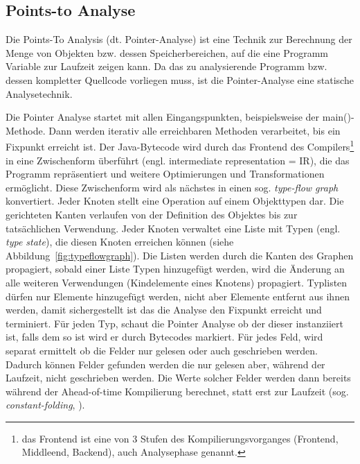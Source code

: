 \subsection{Points-to Analyse}
\label{subsec:pointsto}

Die Points-To Analysis (dt. Pointer-Analyse) ist eine Technik zur Berechnung der Menge von Objekten bzw. dessen Speicherbereichen, auf die eine Programm Variable zur Laufzeit zeigen kann\cite{Hind2001, Smaragdakis2015}. Da das zu analysierende Programm bzw. dessen kompletter Quellcode vorliegen muss, ist die Pointer-Analyse eine statische Analysetechnik.

Die Pointer Analyse startet mit allen Eingangspunkten, beispielsweise der main()-Methode. Dann werden iterativ alle erreichbaren Methoden verarbeitet, bis ein Fixpunkt erreicht ist. Der Java-Bytecode wird durch das Frontend des Compilers\footnote{das Frontend ist eine von 3 Stufen des Kompilierungsvorganges (Frontend, Middleend, Backend), auch Analysephase genannt.} in eine Zwischenform überführt (engl. intermediate representation = IR), die das Programm repräsentiert und weitere Optimierungen und Transformationen ermöglicht\cite{Simon2015}. 
Diese Zwischenform wird als nächstes in einen sog. \textit{type-flow graph} konvertiert. Jeder Knoten stellt eine Operation auf einem Objekttypen dar. Die gerichteten Kanten verlaufen von der Definition des Objektes bis zur tatsächlichen Verwendung. Jeder Knoten verwaltet eine Liste mit Typen (engl. \textit{type state}), die diesen Knoten erreichen können (siehe Abbildung~\ref{fig:typeflowgraph}). 
Die Listen werden durch die Kanten des Graphen propagiert, sobald einer Liste Typen hinzugefügt werden, wird die Änderung an alle weiteren Verwendungen (Kindelemente eines Knotens) propagiert. Typlisten dürfen nur Elemente hinzugefügt werden, nicht aber Elemente entfernt aus ihnen werden, damit sichergestellt ist das die Analyse den Fixpunkt erreicht und terminiert. Für jeden Typ, schaut die Pointer Analyse ob der dieser instanziiert ist, falls dem so ist wird er durch Bytecodes markiert. Für jedes Feld, wird separat ermittelt ob die Felder nur gelesen oder auch geschrieben werden. Dadurch können Felder gefunden werden die nur gelesen aber, während der Laufzeit, nicht geschrieben werden. Die Werte solcher Felder werden dann bereits während der Ahead-of-time Kompilierung berechnet, statt erst zur Laufzeit (sog. \textit{constant-folding}, \cite[Kapitel 4.2]{Grumberg2014}).

